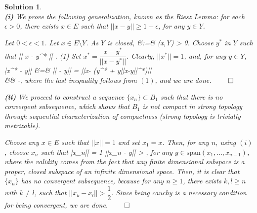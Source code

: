 \documentclass{article} %
\def\eQb#1\eQe{\begin{eqnarray*}#1\end{eqnarray*}}
\theoremstyle{quest}
\newtheorem*{solution}{Solution}
\begin{document}
\begin{solution} \hfill \\
\textbf{(i)} We prove the following generalization, known as the Riesz Lemma:
for each $\epsilon > 0$, there exists $x \in E$ such that $||x - y|| 
\geq 1 - \epsilon$, for any $y \in Y$. 

\smallskip

Let $0 < \epsilon < 1$. Let $x \in E\setminus Y$. As $Y$ is closed,
\eQb
d &:=& (x,Y) > 0.
\eQe
Choose $y^*$ in $Y$ such that 
\eQb
d \leq || x - y^* || \leq {}. \>\>\> (1)
\eQe
Set $x^* = \dfrac{x-y^*}{||x-y^*||}$. Clearly, $||x^*|| = 1$, and,
for any $y \in Y$,
\eQb
||x^* - y|| &=& || - y|| = 
||x- (y^* + y||x-y||^*)|| \\
&\geq&   -\epsilon, 
\eQe 
where the last inequality follows from $(1)$, and we are done. \hfill $\qed$ 

\bigskip

\textbf{(ii)} We proceed to construct a sequence $\{x_n\} \subset B_1$ 
such that there is no convergent subsequence, which shows that $B_1$ is not
compact in strong topology through sequential characterization of compactness
(strong topology is trivially metrizable). 

\smallskip
Choose any $x \in E$ such that $||x|| = 1$ and set $x_1 = x$. 
Then, for any $n$, using $(i)$, 
choose $x_n$ such that 
\eQb
||x_n|| = 1 \>\>   \>\> ||x_n - y|| > , 
\eQe
for any $y \in \text{span}(x_1,...,x_{n-1})$, where the validity comes from
the fact that any finite dimensional subspace is a proper, closed subspace
of an infinite dimensional space. Then, it is clear that $\{x_n\}$ has no
convergent subsequence, because for any $n \geq 1$, there exists $k, l \geq n$
with $k \neq l$, such that $||x_k - x_l|| > \dfrac{1}{2}$. Since being cauchy
is a necessary condition for being convergent, we are done. 
\hfill $\qed$ 

\end{solution}

\newpage
\end{document}
